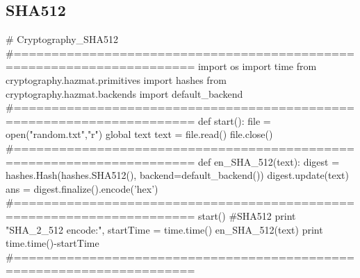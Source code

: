 \documentclass{article}
\begin{document}
\subsection{SHA512}
\begin{python}
# Cryptography_SHA512
#======================================================================
import os
import time
from cryptography.hazmat.primitives import hashes
from cryptography.hazmat.backends import default_backend
#======================================================================
def start():
    file = open("random.txt","r")
    global text 
    text = file.read()
    file.close()
#======================================================================
def en_SHA_512(text):
    digest = hashes.Hash(hashes.SHA512(), backend=default_backend())
    digest.update(text)
    ans = digest.finalize().encode('hex')
#======================================================================
start()
#SHA512
print "SHA_2_512   encode:",
startTime = time.time()
en_SHA_512(text)
print time.time()-startTime
#======================================================================
\end{python}
\newpage
\end{document}
